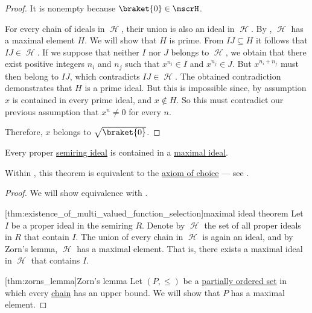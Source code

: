 \begin{proof}
  It is nonempty because \( \braket{0} \in \mscrH \).

  For every chain of ideals in \( \mscrH \), their union is also an ideal in \( \mscrH \). By , \( \mscrH \) has a maximal element \( H \). We will show that \( H \) is prime. From \( IJ \subseteq H \) it follows that \( IJ \in \mscrH \). If we suppose that neither \( I \) nor \( J \) belongs to \( \mscrH \), we obtain that there exist positive integers \( n_i \) and \( n_j \) such that \( x^{n_i} \in I \) and \( x^{n_j} \in J \). But \( x^{n_i + n_j} \) must then belong to \( IJ \), which contradicts \( IJ \in \mscrH \). The obtained contradiction demonstrates that \( H \) is a prime ideal. But this is impossible since, by assumption \( x \) is contained in every prime ideal, and \( x \not\in H \). So this must contradict our previous assumption that \( x^n \neq 0 \) for every \( n \).

  Therefore, \( x \) belongs to \( \sqrt{\braket{0}} \).
\end{proof}

\begin{theorem}\label{thm:maximal_ideal_theorem}
  Every proper \hyperref[def:semiring_ideal]{semiring ideal} is contained in a \hyperref[def:derived_semiring_ideals/maximal]{maximal ideal}.

  Within \hyperref[def:zfc]{}, this theorem is equivalent to the \hyperref[def:zfc/choice]{axiom of choice} --- see .
\end{theorem}
\begin{proof}
  We will show equivalence with .

  [thm:existence_of_multi_valued_function_selection]{maximal ideal theorem} Let \( I \) be a proper ideal in the semiring \( R \). Denote by \( \mscrH \) the set of all proper ideals in \( R \) that contain \( I \). The union of every chain in \( \mscrH \) is again an ideal, and by Zorn's lemma, \( \mscrH \) has a maximal element. That is, there exists a maximal ideal in \( \mscrH \) that contains \( I \).

  [thm:zorns_lemma]{Zorn's lemma} Let \( (P, \leq) \) be a \hyperref[def:partially_ordered_set]{partially ordered set} in which every \hyperref[def:partially_ordered_set_chain_and_antichain]{chain} has an upper bound. We will show that \( P \) has a maximal element.
\end{proof}
